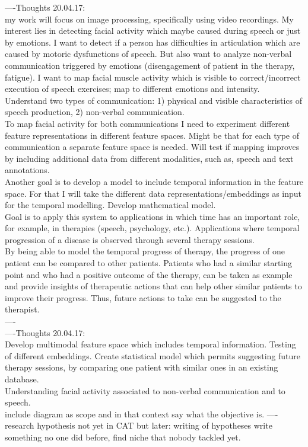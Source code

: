 ----Thoughts 20.04.17:\\
my work will focus on image processing, specifically using video recordings. My interest lies in detecting facial activity which maybe caused during speech or just  by emotions. I want to detect if a person has difficulties in articulation which are caused by motoric dysfunctions of speech. But also want to analyze non-verbal communication triggered by emotions (disengagement of patient in the therapy, fatigue). I want to map facial muscle activity which is visible to correct/incorrect execution of speech exercises; map to different emotions and intensity. Understand two types of communication: 1) physical and visible characteristics of speech production, 2) non-verbal communication.\\

To map facial activity for both communications I need to experiment different feature representations in different feature spaces. Might be that for each type of communication a separate feature space is needed. Will test if mapping improves by including additional data from different modalities, such as, speech and text annotations. \\

Another goal is to develop a model to include temporal information in the feature space. For that I will take the different data representations/embeddings as input for the temporal modelling. Develop mathematical model.\\

Goal is to apply this system to applications in which time has an important role, for example, in therapies (speech, psychology, etc.). Applications where temporal progression of a disease is observed through several therapy sessions.\\

By being able to model the temporal progress of therapy, the progress of one patient can be compared to other patients. Patients who had a similar starting point and who had a positive outcome of the therapy, can be taken as example and provide insights of therapeutic actions that can help other similar patients to improve their progress. Thus, future actions to take can be suggested to the therapist.   
\\
----\\



----Thoughts 20.04.17:\\
Develop multimodal feature space which includes temporal information. Testing of different embeddings. Create statistical model which permits suggesting future therapy sessions, by comparing one patient with similar ones in an existing database.\\
Understanding facial activity associated to non-verbal communication and to speech.\\ include diagram as scope and in that context say what the objective is.
----\\
research hypothesis not yet in CAT but later: writing of hypotheses write something no one did before, find niche that nobody tackled yet. 


